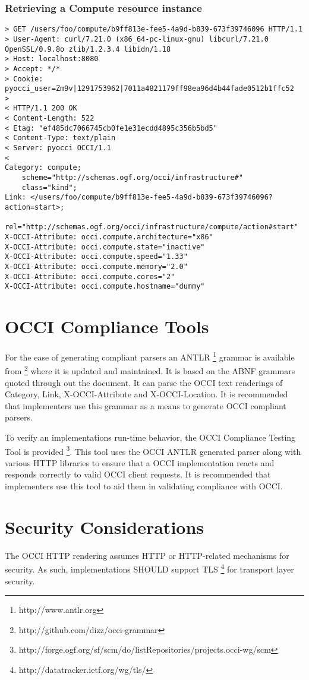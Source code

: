 \documentclass[10pt,a4paper]{article}
\begin{document}
\subsubsection{Retrieving a Compute resource instance}
\begin{verbatim}
> GET /users/foo/compute/b9ff813e-fee5-4a9d-b839-673f39746096 HTTP/1.1
> User-Agent: curl/7.21.0 (x86_64-pc-linux-gnu) libcurl/7.21.0 OpenSSL/0.9.8o zlib/1.2.3.4 libidn/1.18
> Host: localhost:8080
> Accept: */*
> Cookie: pyocci_user=Zm9v|1291753962|7011a4821179ff98ea96d4b44fade0512b1ffc52
> 
< HTTP/1.1 200 OK
< Content-Length: 522
< Etag: "ef485dc7066745cb0fe1e31ecdd4895c356b5bd5"
< Content-Type: text/plain
< Server: pyocci OCCI/1.1
< 
Category: compute;
    scheme="http://schemas.ogf.org/occi/infrastructure#"
    class="kind";
Link: </users/foo/compute/b9ff813e-fee5-4a9d-b839-673f39746096?action=start>;
    rel="http://schemas.ogf.org/occi/infrastructure/compute/action#start"
X-OCCI-Attribute: occi.compute.architecture="x86"
X-OCCI-Attribute: occi.compute.state="inactive"
X-OCCI-Attribute: occi.compute.speed="1.33"
X-OCCI-Attribute: occi.compute.memory="2.0"
X-OCCI-Attribute: occi.compute.cores="2"
X-OCCI-Attribute: occi.compute.hostname="dummy"
\end{verbatim}

\section{OCCI Compliance Tools}
For the ease of generating compliant parsers an
ANTLR \footnote{http://www.antlr.org} grammar is available
from \footnote{http://github.com/dizz/occi-grammar} where it is
updated and maintained. It is based on the ABNF grammars quoted
through out the document. It can parse the OCCI text renderings of
Category, Link, X-OCCI-Attribute and X-OCCI-Location. It is
recommended that implementers use this grammar as a means to generate
OCCI compliant parsers.

To verify an implementations run-time behavior, the OCCI Compliance
Testing Tool is provided
\footnote{http://forge.ogf.org/sf/scm/do/listRepositories/projects.occi-wg/scm}.
This tool uses the OCCI ANTLR generated parser along with various HTTP
libraries to ensure that a OCCI implementation reacts and responds
correctly to valid OCCI client requests. It is recommended that
implementers use this tool to aid them in validating compliance with
OCCI.

\section{Security Considerations}
\label{sec:sec_consid}
The OCCI HTTP rendering assumes HTTP or HTTP-related mechanisms for
security. As such, implementations SHOULD support
TLS \footnote{http://datatracker.ietf.org/wg/tls/} for transport layer
security.
\end{document}
